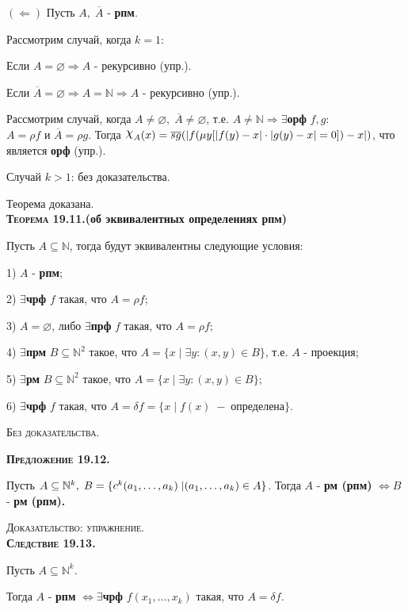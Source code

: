 \documentclass[18pt, a4paper]{extarticle}
\newcommand{\predl}[1]{\textbf{\textsc{Предложение #1}}}
\newcommand{\sled}[1]{\textbf{\textsc{Следствие #1}}}
\newcommand{\teor}[1]{\textbf{\textsc{Теорема #1}}}
\newcommand{\dokup}{\textsc{Доказательство: упражнение.}}
\newcommand{\bezdok}{\textsc{Без доказательства.}}
\begin{document}
$\boxed{(\Leftarrow)}$ Пусть $A,\;\overline{A}$ -  \textbf{рпм}.

Рассмотрим случай, когда $k = 1:$

Если $A=\varnothing\Rightarrow A$ - рекурсивно (упр.).

Если $\overline{A}=\varnothing\Rightarrow A=\mathbb N\Rightarrow A$ - рекурсивно (упр.).

Рассмотрим случай, когда $A\neq\varnothing,\;\overline{A}\neq\varnothing$, т.е. $A\neq\mathbb N\Rightarrow\exists$\textbf{орф} $f,g:$\\
$A=\rho f$ и $\overline{A}=\rho g$. Тогда $\raisebox{.5ex}{\scalebox{1.2}{$\chi$}}_A(x)=\overline{sg}(|f(\mu y[|f(y)-x|\cdot|g(y)-x|=0])-x|)$, что является \textbf{орф} (упр.).

Случай $k > 1$: без доказательства.

Теорема доказана.\\

\teor{19.11.}\textbf{(об эквивалентных определениях рпм)}

Пусть $A\subseteq\mathbb N$, тогда будут эквивалентны следующие условия:

1) $A$ -  \textbf{рпм};

2) $\exists$\textbf{чрф} $f$ такая, что $A=\rho f$;

3) $A=\varnothing$, либо $\exists$\textbf{прф} $f$ такая, что $A=\rho f;$

4) $\exists$\textbf{прм} $B\subseteq\mathbb N^2$ такое, что $A=\{x\;|\;\exists y:(x,y)\in B\}$, т.е. $A$ - проекция;

5) $\exists$\textbf{рм} $B\subseteq\mathbb N^2$ такое, что $A=\{x\;|\;\exists y:(x,y)\in B\};$

6) $\exists$\textbf{чрф} $f$ такая, что $A=\delta f=\{x\;|\;f(x)\;-\;\text{определена}\}$.

\bezdok

\predl{19.12.} 

Пусть $A\subseteq\mathbb N^k,\;B=\{c^k(a_1,\dots,a_k)\;|\newline (a_1,\dots,a_k)\in A\}$. Тогда $A$ -  \textbf{рм (рпм)} $\Leftrightarrow B$ -  \textbf{рм (рпм).}

\dokup\\

\sled{19.13.} 

Пусть $A\subseteq\mathbb N^k$. 

Тогда $A$ -  \textbf{рпм} $\Leftrightarrow\exists$\textbf{чрф} $f(x_1,\dots,x_k)$ такая, что $A=\delta f$.
\end{document}
